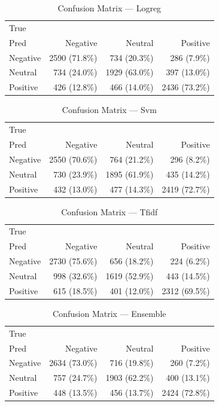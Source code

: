 \begin{table}[htbp]
\centering
\caption{Confusion Matrix — Logreg}
\label{tab:cm_logreg}
\begin{tabular}{lrrr}
\toprule
True \\ Pred & Negative & Neutral & Positive \\
\midrule
Negative & 2590 (71.8\%) & 734 (20.3\%) & 286 (7.9\%) \\
Neutral & 734 (24.0\%) & 1929 (63.0\%) & 397 (13.0\%) \\
Positive & 426 (12.8\%) & 466 (14.0\%) & 2436 (73.2\%) \\
\bottomrule
\end{tabular}
\end{table}

\begin{table}[htbp]
\centering
\caption{Confusion Matrix — Svm}
\label{tab:cm_svm}
\begin{tabular}{lrrr}
\toprule
True \\ Pred & Negative & Neutral & Positive \\
\midrule
Negative & 2550 (70.6\%) & 764 (21.2\%) & 296 (8.2\%) \\
Neutral & 730 (23.9\%) & 1895 (61.9\%) & 435 (14.2\%) \\
Positive & 432 (13.0\%) & 477 (14.3\%) & 2419 (72.7\%) \\
\bottomrule
\end{tabular}
\end{table}

\begin{table}[htbp]
\centering
\caption{Confusion Matrix — Tfidf}
\label{tab:cm_tfidf}
\begin{tabular}{lrrr}
\toprule
True \\ Pred & Negative & Neutral & Positive \\
\midrule
Negative & 2730 (75.6\%) & 656 (18.2\%) & 224 (6.2\%) \\
Neutral & 998 (32.6\%) & 1619 (52.9\%) & 443 (14.5\%) \\
Positive & 615 (18.5\%) & 401 (12.0\%) & 2312 (69.5\%) \\
\bottomrule
\end{tabular}
\end{table}

\begin{table}[htbp]
\centering
\caption{Confusion Matrix — Ensemble}
\label{tab:cm_ensemble}
\begin{tabular}{lrrr}
\toprule
True \\ Pred & Negative & Neutral & Positive \\
\midrule
Negative & 2634 (73.0\%) & 716 (19.8\%) & 260 (7.2\%) \\
Neutral & 757 (24.7\%) & 1903 (62.2\%) & 400 (13.1\%) \\
Positive & 448 (13.5\%) & 456 (13.7\%) & 2424 (72.8\%) \\
\bottomrule
\end{tabular}
\end{table}

